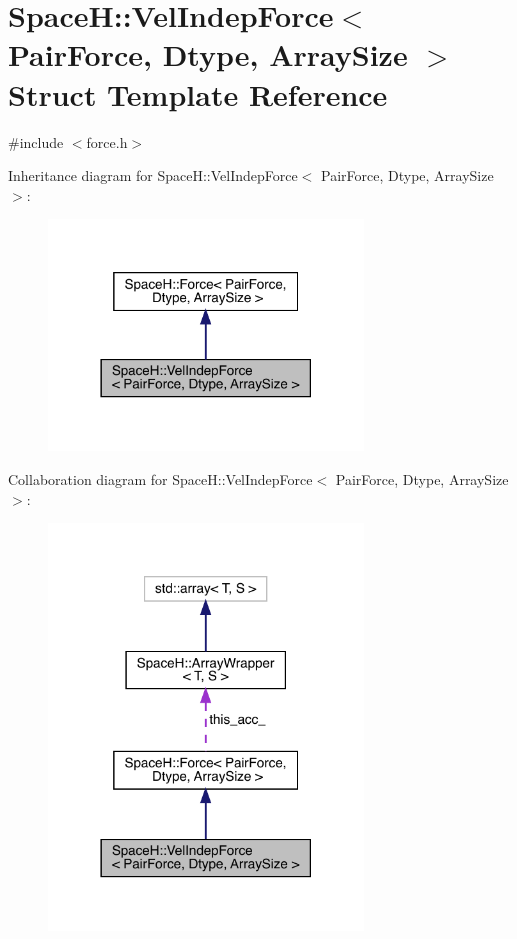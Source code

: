 \hypertarget{struct_space_h_1_1_vel_indep_force}{}\section{SpaceH\+:\+:Vel\+Indep\+Force$<$ Pair\+Force, Dtype, Array\+Size $>$ Struct Template Reference}
\label{struct_space_h_1_1_vel_indep_force}


{\ttfamily \#include $<$force.\+h$>$}



Inheritance diagram for SpaceH\+:\+:Vel\+Indep\+Force$<$ Pair\+Force, Dtype, Array\+Size $>$\+:\nopagebreak
\begin{figure}[H]
\begin{center}
\leavevmode
\includegraphics[width=237pt]{struct_space_h_1_1_vel_indep_force__inherit__graph}
\end{center}
\end{figure}


Collaboration diagram for SpaceH\+:\+:Vel\+Indep\+Force$<$ Pair\+Force, Dtype, Array\+Size $>$\+:\nopagebreak
\begin{figure}[H]
\begin{center}
\leavevmode
\includegraphics[width=237pt]{struct_space_h_1_1_vel_indep_force__coll__graph}
\end{center}
\end{figure}
